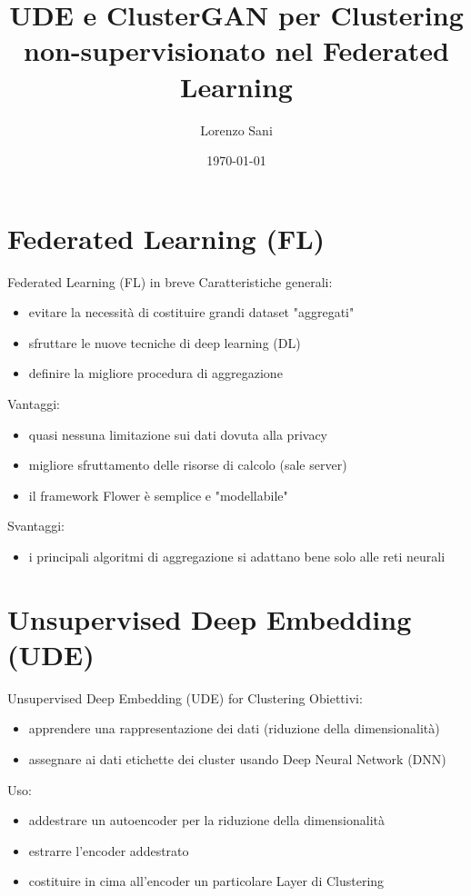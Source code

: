 \documentclass{beamer}
\title[Unsupervised Clustering in Federated Learning]{UDE e ClusterGAN per Clustering non-supervisionato nel Federated Learning}
\author{Lorenzo Sani}
\institute{Università degli Studi di Bologna}
\date{\today}
\begin{document}
\begin{frame}
  \titlepage
\end{frame}


\section{Federated Learning (FL)}

\begin{frame}{Federated Learning (FL) in breve}
	Caratteristiche generali:
	\cite{9153560}
	\cite{mcmahan2017communicationefficient}
	\begin{itemize}
		\item evitare la necessità di costituire grandi dataset "aggregati"
		\item sfruttare le nuove tecniche di deep learning (DL)
		\item definire la migliore procedura di aggregazione
	\end{itemize}
	Vantaggi:
	\begin{itemize}
		\item quasi nessuna limitazione sui dati dovuta alla privacy
		\item migliore sfruttamento delle risorse di calcolo (sale server)
		\item il framework Flower è semplice e "modellabile" \cite{beutel2021flower}
	\end{itemize}
	Svantaggi:
	\begin{itemize}
		\item i principali algoritmi di aggregazione si adattano bene solo alle reti neurali
	\end{itemize}
\end{frame}

\section{Unsupervised Deep Embedding (UDE)}

\begin{frame}{Unsupervised Deep Embedding (UDE) for Clustering}
	Obiettivi:\cite{DBLP:journals/corr/XieGF15}
	\begin{itemize}
		\item apprendere una rappresentazione dei dati (riduzione della dimensionalità)
		\item assegnare ai dati etichette dei cluster usando Deep Neural Network (DNN)
	\end{itemize}
	Uso:
	\begin{itemize}
		\item addestrare un autoencoder per la riduzione della dimensionalità
		\item estrarre l'encoder addestrato
		\item costituire in cima all'encoder un particolare Layer di Clustering
	\end{itemize}
\end{frame}
\end{document}
